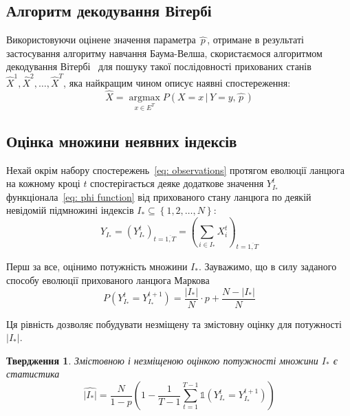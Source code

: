 \documentclass[]{iptconf}
\DeclareMathOperator*{\argmax}{argmax}
\theoremstyle{plain}
\newtheorem{claim}{\indent Твердження}
\begin{document}
\subsection*{Алгоритм декодування Вітербі}

Використовуючи оцінене значення параметра $\widehat{\,p\,}$, отримане в результаті застосування алгоритму навчання Баума-Велша, скористаємося алгоритмом декодування Вітербі~\cite[розділ 6]{Nilsson2005} для пошуку такої послідовності прихованих станів $\widehat{X}^1,\widehat{X}^2,\ldots,\widehat{X}^T$, яка найкращим чином описує наявні спостереження:
\begin{equation*}\label{eq: decoded stated}
    \widehat{X} = \argmax\limits_{x \in E^T} P\left( X=x\,|\,Y=y,\widehat{\,p\,} \right)
\end{equation*}

\subsection{Оцінка множини неявних індексів}

Нехай окрім набору спостережень~\eqref{eq: observations} протягом еволюції ланцюга на кожному кроці $t$ спостерігається деяке додаткове значення $Y^t_{I_*}$ функціонала~\eqref{eq: phi function} від прихованого стану ланцюга по деякій невідомій підмножині індексів $I_* \subseteq \left\{ 1,2,\ldots,N \right\}:$
\begin{equation*}
    Y_{I_*} = \left( Y^t_{I_*} \right)_{t=\overline{1,T}} = \left( \sum_{i \in I_*} X^t_i \right)_{t=\overline{1,T}} 
\end{equation*}

Перш за все, оцінимо потужність множини $I_*$. Зауважимо, що в силу заданого способу еволюції прихованого ланцюга Маркова
\begin{equation*}
    P\left( Y^t_{I_*}=Y^{t+1}_{I_*} \right)=\frac{\left| I_* \right|}{N}\cdot p + \frac{N-\left| I_* \right|}{N}
\end{equation*}

Ця рівність дозволяє побудувати незміщену та змістовну оцінку для потужності $|I_*|$.

\begin{claim}
    Змістовною і незміщеною оцінкою потужності множини $I_*$ є статистика
    \begin{equation}\label{eq: ||I*|| estimation}
        \widehat{|I_*|} = \frac{N}{1-p} \left( 1-\frac{1}{T-1}\sum_{t=1}^{T-1}\mathbb{1}\left( Y^t_{I_*}=Y^{t+1}_{I_*} \right) \right) 
    \end{equation}
\end{claim}
\end{document}
